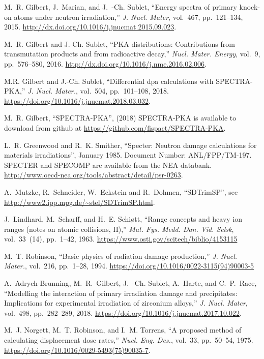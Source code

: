 \documentclass[a4paper]{article}
\begin{document}
\begin{thebibliography}{10}

M.~R. Gilbert, J.~Marian, and J.~{\relax -Ch}. Sublet, ``Energy spectra of
  primary knock-on atoms under neutron irradiation,'' {\em J. Nucl. Mater},
  vol.~467, pp.~121--134, 2015.
\newblock \url{http://dx.doi.org/10.1016/j.jnucmat.2015.09.023}.

M.~R. Gilbert and J.-{\relax Ch}. Sublet, ``{{PKA distributions: Contributions
  from transmutation products and from radioactive decay}},'' {\em Nucl. Mater.
  Energy}, vol.~9, pp.~576--580, 2016.
    \newblock \url{http://dx.doi.org/10.1016/j.nme.2016.02.006}.






M.R. Gilbert and J.-Ch. Sublet, ``{{Differential dpa calculations with
  SPECTRA-PKA}},'' {\em J. Nucl. Mater.}, vol.~504, pp.~101--108, 2018.
    \newblock \url{https://doi.org/10.1016/j.jnucmat.2018.03.032}.

M.~R. Gilbert, ``{SPECTRA-PKA}'',  (2018) {SPECTRA-PKA is available to download
  from github at \url{https://github.com/fispact/SPECTRA-PKA}}.

L.~R. Greenwood and R.~K. Smither,
  ``Specter: Neutron damage calculations for materials
  irradiations'', January 1985. Document Number:
  ANL/FPP/TM-197. SPECTER and SPECOMP are available from the NEA databank.
\newblock \url{http://www.oecd-nea.org/tools/abstract/detail/psr-0263}.

A.~Mutzke, R.~Schneider, W.~Eckstein and R.~Dohmen, ``{SDTrimSP}'',  {see \url{http://www2.ipp.mpg.de/~stel/SDTrimSP.html}}.

J.~Lindhard, M.~Scharff, and H.~E. Schi{\o}tt,
  ``{{Range concepts and heavy
  ion ranges (notes on atomic collisions, {II})}},'' {\em Mat. Fys. Medd. Dan. Vid.
  Selsk}, vol.~33~(14), pp.~1--42, 1963.
\newblock\url{https://www.osti.gov/scitech/biblio/4153115}

M.~T. Robinson, ``{{Basic physics of radiation damage production}},'' {\em J. Nucl. Mater.}, vol.~216, pp.~1--28, 1994.
\newblock
  \url{https://doi.org/10.1016/0022-3115(94)90003-5}


A.~Adrych-Brunning, M.~R.~Gilbert, J.~{\relax -Ch}. Sublet, A.~Harte, and C.~P.~Race, ``Modelling the interaction of primary irradiation damage and
precipitates: Implications for experimental irradiation of zirconium
alloys,'' {\em J. Nucl. Mater},
  vol.~498, pp.~282--289, 2018.
\newblock \url{https://doi.org/10.1016/j.jnucmat.2017.10.022}.

M.~J. Norgett, M.~T. Robinson, and I.~M. Torrens, ``{{A proposed method of calculating
  displacement dose rates}},'' {\em Nucl. Eng. Des.}, vol.~33, pp.~50--54, 1975.
\newblock \url{https://doi.org/10.1016/0029-5493(75)90035-7}.







\end{thebibliography}
\end{document}
